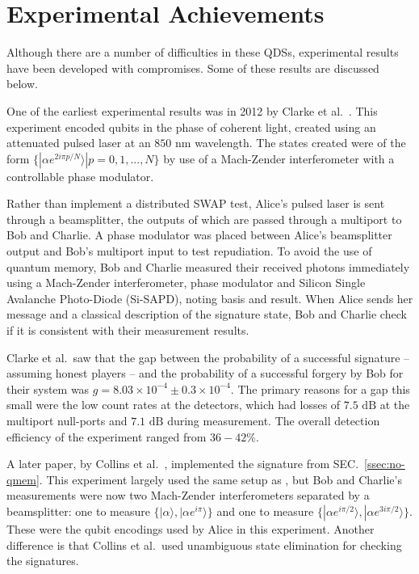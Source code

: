 \documentclass[%
 reprint,
 amsmath,amssymb,
 aps,
 pra,
]{revtex4-1}
\begin{document}
\section{Experimental Achievements}
\label{sec:experiments}

Although there are a number of difficulties in these QDSs, experimental results have been developed with compromises. Some of these results are discussed below.

One of the earliest experimental results was in 2012 by Clarke et al.\ \cite{CCD+12}. This experiment encoded qubits in the phase of coherent light, created using an attenuated pulsed laser at an $850 \text{ nm}$ wavelength. The states created were of the form $\{|\alpha e^{2i\pi p/N}\rangle| p = 0,1,...,N\}$ by use of a Mach-Zender interferometer with a controllable phase modulator.

Rather than implement a distributed SWAP test, Alice's pulsed laser is sent through a beamsplitter, the outputs of which are passed through a multiport to Bob and Charlie. A phase modulator was placed between Alice's beamsplitter output and Bob's multiport input to test repudiation. To avoid the use of quantum memory, Bob and Charlie measured their received photons immediately using a Mach-Zender interferometer, phase modulator and Silicon Single Avalanche Photo-Diode (Si-SAPD), noting basis and result. When Alice sends her message and a classical description of the signature state, Bob and Charlie check if it is consistent with their measurement results.

Clarke et al.\ saw that the gap between the probability of a successful signature -- assuming honest players -- and the probability of a successful forgery by Bob for their system was $g = 8.03 \times 10^{-4} \pm 0.3 \times 10^{-4}$. The primary reasons for a gap this small were the low count rates at the detectors, which had losses of $7.5 \text{ dB}$ at the multiport null-ports and $7.1 \text{ dB}$ during measurement. The overall detection efficiency of the experiment ranged from $36-42\%$.

A later paper, by Collins et al.\ \cite{PhysRevLett.113.040502}, implemented the signature from SEC.\ \ref{ssec:no-qmem}. This experiment largely used the same setup as \cite{CCD+12}, but Bob and Charlie's measurements were now two Mach-Zender interferometers separated by a beamsplitter: one to measure $\{|\alpha\rangle, |\alpha e^{i\pi}\rangle\}$ and one to measure $\{|\alpha e^{i\pi/2}\rangle, |\alpha e^{3i\pi/2}\rangle\}$. These were the qubit encodings used by Alice in this experiment. Another difference is that Collins et al.\ used unambiguous state elimination for checking the signatures.
\end{document}
